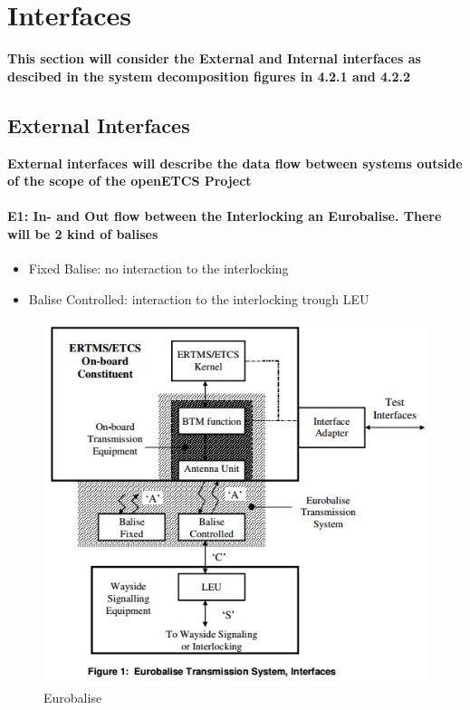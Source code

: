 \newpage
\section{Interfaces}
\textbf{This section will consider the External and Internal interfaces as descibed in the system decomposition figures in 4.2.1 and 4.2.2}

\subsection{External Interfaces}
\textbf{External interfaces will describe the data flow between systems outside of the scope of the openETCS Project}

\paragraph*{E1: In- and Out flow between the Interlocking an Eurobalise. There will be 2 kind of balises}

\begin{itemize}
\item Fixed Balise: no interaction to the interlocking
\item Balise Controlled: interaction to the interlocking trough LEU
\end{itemize}

\begin{figure}[h]
\centering
\includegraphics[scale=0.8]{images/Eurobalise}
\caption{Eurobalise}
\label{Eurobalise}
\end{figure}


